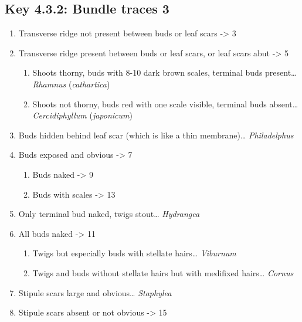 \documentclass[openany]{book}
\providecommand{\tightlist}{%
  \setlength{\itemsep}{0pt}\setlength{\parskip}{0pt}}
\begin{document}
\hypertarget{key-4.3.2-bundle-traces-3}{%
\subsection{Key 4.3.2: Bundle traces
3}\label{key-4.3.2-bundle-traces-3}}

\begin{enumerate}
\def\labelenumi{\arabic{enumi}.}
\tightlist
\item
  Transverse ridge not present between buds or leaf scars
  -\textgreater{} 3
\item
  Transverse ridge present between buds or leaf scars, or leaf scars
  abut -\textgreater{} 5

  \begin{enumerate}
  \def\labelenumii{\arabic{enumii}.}
  \setcounter{enumii}{2}
  \tightlist
  \item
    Shoots thorny, buds with 8-10 dark brown scales, terminal buds
    present\ldots{} \emph{Rhamnus} (\emph{cathartica})
  \item
    Shoots not thorny, buds red with one scale visible, terminal buds
    absent\ldots{} \emph{Cercidiphyllum} (\emph{japonicum})
  \end{enumerate}
\item
  Buds hidden behind leaf scar (which is like a thin membrane)\ldots{}
  \emph{Philadelphus}
\item
  Buds exposed and obvious -\textgreater{} 7

  \begin{enumerate}
  \def\labelenumii{\arabic{enumii}.}
  \setcounter{enumii}{6}
  \tightlist
  \item
    Buds naked -\textgreater{} 9
  \item
    Buds with scales -\textgreater{} 13
  \end{enumerate}
\item
  Only terminal bud naked, twigs stout\ldots{} \emph{Hydrangea}
\item
  All buds naked -\textgreater{} 11

  \begin{enumerate}
  \def\labelenumii{\arabic{enumii}.}
  \setcounter{enumii}{10}
  \tightlist
  \item
    Twigs but especially buds with stellate hairs\ldots{}
    \emph{Viburnum}
  \item
    Twigs and buds without stellate hairs but with medifixed
    hairs\ldots{} \emph{Cornus}
  \end{enumerate}
\item
  Stipule scars large and obvious\ldots{} \emph{Staphylea}
\item
  Stipule scars absent or not obvious -\textgreater{} 15


\end{enumerate}
\end{document}
